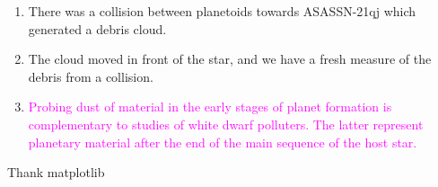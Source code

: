 \documentclass{aa}
\begin{document}
   \begin{enumerate}
      \item There was a collision between planetoids towards ASASSN-21qj which generated a debris cloud.
      \item The cloud moved in front of the star, and we have a fresh measure of the debris from a collision.
     \item \textcolor{magenta}{Probing dust of material in the early stages of planet formation is complementary to studies of white dwarf polluters. The latter represent planetary material after the end of the main sequence of the host star. }
   \end{enumerate}

\begin{acknowledgements}
Thank matplotlib

\end{acknowledgements}



\end{document}
